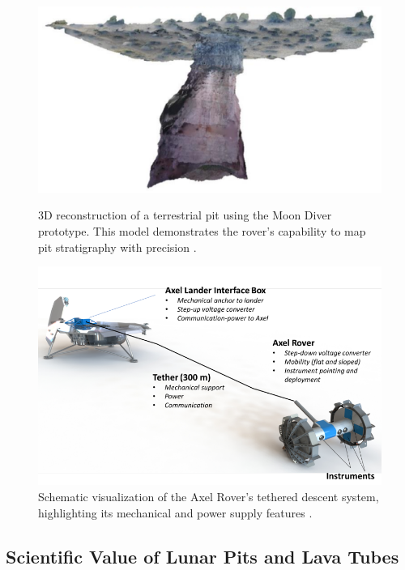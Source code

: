 \begin{figure}[H]
    \centering
    \begin{minipage}[b]{0.49\textwidth}
        \centering
        \includegraphics[width=\textwidth]{moon-diver-pit-recon.png}
        \caption{3D reconstruction of a terrestrial pit using the Moon Diver prototype. This model demonstrates the rover’s capability to map pit stratigraphy with precision \cite{kerber2023}.}
        \label{fig:moon_diver_3d_recon}
    \end{minipage}
    \hfill
    \begin{minipage}[b]{0.49\textwidth}
        \centering
        \includegraphics[width=\textwidth]{moon-diver-schemoid.png}
        \caption{Schematic visualization of the Axel Rover’s tethered descent system, highlighting its mechanical and power supply features \cite{nesnas2019}.}
        \label{fig:moon_diver_schematic}
    \end{minipage}
\end{figure}

\subsection{Scientific Value of Lunar Pits and Lava Tubes}

